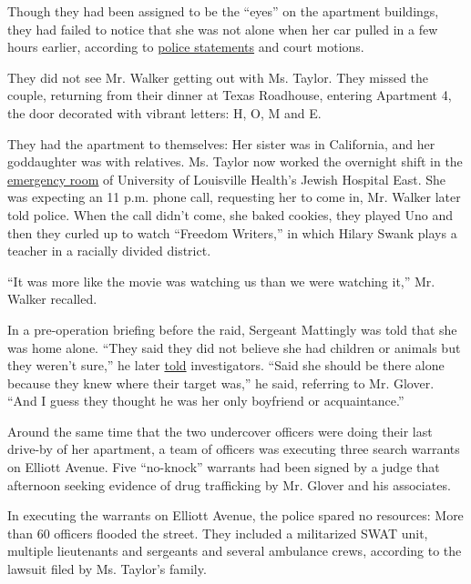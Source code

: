 Though they had been assigned to be the ``eyes'' on the apartment
buildings, they had failed to notice that she was not alone when her car
pulled in a few hours earlier, according to
\href{https://www.nbcnews.com/video/new-audio-of-police-officer-sheds-light-on-police-investigation-into-breonna-taylor-s-death-86779973611}{police
statements} and court motions.

They did not see Mr. Walker getting out with Ms. Taylor. They missed the
couple, returning from their dinner at Texas Roadhouse, entering
Apartment 4, the door decorated with vibrant letters: H, O, M and E.

They had the apartment to themselves: Her sister was in California, and
her goddaughter was with relatives. Ms. Taylor now worked the overnight
shift in the
\href{https://www.springvalleyfuneral.net/obituaries/Breonna-Taylor?obId=12420734}{emergency
room} of University of Louisville Health's Jewish Hospital East. She was
expecting an 11 p.m. phone call, requesting her to come in, Mr. Walker
later told police. When the call didn't come, she baked cookies, they
played Uno and then they curled up to watch ``Freedom Writers,'' in
which Hilary Swank plays a teacher in a racially divided district.

``It was more like the movie was watching us than we were watching it,''
Mr. Walker recalled.

In a pre-operation briefing before the raid, Sergeant Mattingly was told
that she was home alone. ``They said they did not believe she had
children or animals but they weren't sure,'' he later
\href{https://www.nbcnews.com/video/new-audio-of-police-officer-sheds-light-on-police-investigation-into-breonna-taylor-s-death-86779973611}{told}
investigators. ``Said she should be there alone because they knew where
their target was,'' he said, referring to Mr. Glover. ``And I guess they
thought he was her only boyfriend or acquaintance.''

Around the same time that the two undercover officers were doing their
last drive-by of her apartment, a team of officers was executing three
search warrants on Elliott Avenue. Five ``no-knock'' warrants had been
signed by a judge that afternoon seeking evidence of drug trafficking by
Mr. Glover and his associates.

In executing the warrants on Elliott Avenue, the police spared no
resources: More than 60 officers flooded the street. They included a
militarized SWAT unit, multiple lieutenants and sergeants and several
ambulance crews, according to the lawsuit filed by Ms. Taylor's family.

